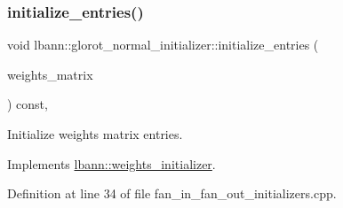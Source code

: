 \subsubsection{\texorpdfstring{initialize\+\_\+entries()}{initialize\_entries()}}
{\footnotesize\ttfamily void lbann\+::glorot\+\_\+normal\+\_\+initializer\+::initialize\+\_\+entries (\begin{DoxyParamCaption}\item[{\hyperlink{base_8hpp_a9a697a504ae84010e7439ffec862b470}{Abs\+Dist\+Mat} \&}]{weights\+\_\+matrix }\end{DoxyParamCaption}) const\hspace{0.3cm}{\ttfamily [override]}, {\ttfamily [virtual]}}

Initialize weights matrix entries. 

Implements \hyperlink{classlbann_1_1weights__initializer_a2ad6acf904c0c7bc7406dbd9851107be}{lbann\+::weights\+\_\+initializer}.



Definition at line 34 of file fan\+\_\+in\+\_\+fan\+\_\+out\+\_\+initializers.\+cpp.


